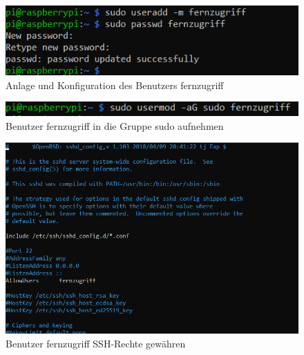 \documentclass[a4paper, 11pt]{scrartcl}
\begin{document}
\begin{figure}[H]
    \begin{center}
        \includegraphics[scale=1]{Bilder/useradd_fernzugriff.png}
        \caption{Anlage und Konfiguration des Benutzers \glqq fernzugriff\grqq}\label{pic:useradd_fernzugriff}
    \end{center}
\end{figure}

\begin{figure}[H]
    \begin{center}
        \includegraphics[scale=1]{Bilder/sudo_fernzugriff.png}
        \caption{Benutzer \glqq fernzugriff\grqq{} in die Gruppe sudo aufnehmen}\label{pic:usermod_fernzugriff}
    \end{center}
\end{figure}

\begin{figure}[H]
    \begin{center}
        \includegraphics[scale=1]{Bilder/ssh_fernzugriff.png}
        \caption{Benutzer \glqq fernzugriff\grqq{} SSH-Rechte gewähren}\label{pic:ssh_fernzugriff}
    \end{center}
\end{figure}
\end{document}
